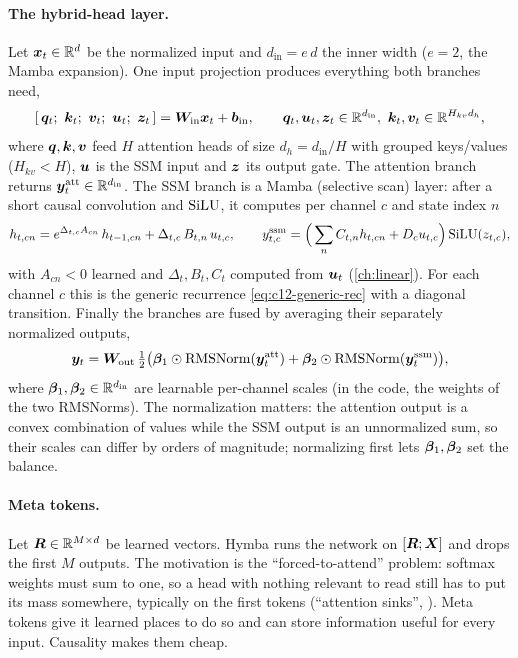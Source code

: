 \paragraph{The hybrid-head layer.} Let $\bm{x}_t\in\mathbb{R}^d$ be the normalized input and $d_{\mathrm{in}}
= e\,d$ the inner width ($e = 2$, the Mamba expansion). One input projection produces everything
both branches need,
\begin{equation}\label{eq:c12-hymba-in}
  [\,\vq_t;\ \vk_t;\ \vv_t;\ \vu_t;\ \vz_t\,] = \mW_{\mathrm{in}}\vx_t + \vb_{\mathrm{in}},
  \qquad \vq_t,\vu_t,\vz_t\in\R^{d_{\mathrm{in}}},\ \vk_t,\vv_t\in\R^{H_{kv}d_h},
\end{equation}
where $\bm{q},\bm{k},\bm{v}$ feed $H$ attention heads of size $d_h = d_{\mathrm{in}}/H$ with grouped
keys/values ($H_{kv}<H$), $\bm{u}$ is the SSM input and $\bm{z}$ its output gate. The attention branch
returns $\bm{y}^{\mathrm{att}}_t\in\mathbb{R}^{d_{\mathrm{in}}}$. The SSM branch is a Mamba (selective
scan) layer: after a short causal convolution and $\operatorname{SiLU}$, it computes per channel $c$ and state
index $n$
\begin{equation}\label{eq:c12-mamba1}
  h_{t,cn} = e^{\Delta_{t,c}A_{cn}}\,h_{t-1,cn} + \Delta_{t,c}\,B_{t,n}\,u_{t,c},\qquad
  y^{\mathrm{ssm}}_{t,c} = \Big(\sum_n C_{t,n}h_{t,cn} + D_cu_{t,c}\Big)\operatorname{SiLU}(z_{t,c}),
\end{equation}
with $A_{cn}<0$ learned and $\Delta_t, B_t, C_t$ computed from $\bm{u}_t$ (\cref{ch:linear}).
For each channel $c$ this is the generic recurrence \eqref{eq:c12-generic-rec} with a diagonal
transition. Finally the branches are fused by averaging their separately normalized outputs,
\begin{equation}\label{eq:c12-hymba-fuse}
  \bm{y}_t = \bm{W}_{\mathrm{out}}\,\tfrac12\big(\bm{\beta}_1\odot\operatorname{RMSNorm}(\bm{y}^{\mathrm{att}}_t) +
  \bm{\beta}_2\odot\operatorname{RMSNorm}(\bm{y}^{\mathrm{ssm}}_t)\big),
\end{equation}
where $\bm{\beta}_1,\bm{\beta}_2\in\mathbb{R}^{d_{\mathrm{in}}}$ are learnable per-channel scales (in the code, the
weights of the two RMSNorms). The normalization matters: the attention output is a convex
combination of values while the SSM output is an unnormalized sum, so their scales can differ
by orders of magnitude; normalizing first lets $\bm{\beta}_1,\bm{\beta}_2$ set the balance.

\paragraph{Meta tokens.} Let $\bm{R}\in\mathbb{R}^{M\times d}$ be learned vectors. Hymba runs the network on
$[\bm{R};\bm{X}]$ and drops the first $M$ outputs. The motivation is the ``forced-to-attend'' problem:
softmax weights must sum to one, so a head with nothing relevant to read still has to put its
mass somewhere, typically on the first tokens (``attention sinks'',
\citealp{xiao2023streamingllm}). Meta tokens give it learned places to do so and can store
information useful for every input. Causality makes them cheap.


